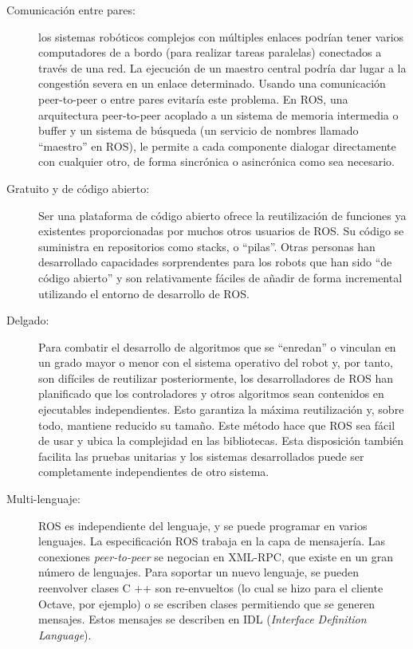 \begin{description}
	\item[Comunicación entre pares:] los sistemas robóticos complejos con múltiples enlaces podrían tener varios computadores de a bordo (para realizar tareas paralelas) conectados a través de una red. La ejecución de un maestro central podría dar lugar a la congestión severa en un enlace determinado. Usando una comunicación peer-to-peer o entre pares evitaría este problema. En ROS, una arquitectura peer-to-peer acoplado a un sistema de memoria intermedia o buffer y un sistema de búsqueda (un servicio de nombres llamado ``maestro'' en ROS), le permite a cada componente dialogar directamente con cualquier otro, de forma sincrónica o asincrónica como sea necesario.

	\item[Gratuito y de código abierto:] Ser una plataforma de código abierto ofrece la reutilización de funciones ya existentes proporcionadas por muchos otros usuarios de ROS. Su código se suministra en repositorios como stacks, o ``pilas''. Otras personas han desarrollado capacidades sorprendentes para los robots que han sido ``de código abierto'' y son relativamente fáciles de añadir de forma incremental utilizando el entorno de desarrollo de ROS.

	\item[Delgado:] Para combatir el desarrollo de algoritmos que se ``enredan'' o vinculan en un grado mayor o menor con el sistema operativo del robot y, por tanto, son difíciles de reutilizar posteriormente, los desarrolladores de ROS han planificado que los controladores y otros algoritmos sean contenidos en ejecutables independientes. Esto garantiza la máxima reutilización y, sobre todo, mantiene reducido su tamaño. Este método hace que ROS sea fácil de usar y ubica la complejidad en las bibliotecas. Esta disposición también facilita las pruebas unitarias y los sistemas desarrollados puede ser completamente independientes de otro sistema.

	\item[Multi-lenguaje:] ROS es independiente del lenguaje, y se puede programar en varios lenguajes. La especificación ROS trabaja en la capa de mensajería. Las conexiones \textit{peer-to-peer} se negocian en XML-RPC, que existe en un gran número de lenguajes. Para soportar un nuevo lenguaje, se pueden reenvolver clases C ++ son re-envueltos (lo cual se hizo para el cliente Octave, por ejemplo) o se escriben clases permitiendo que se generen mensajes. Estos mensajes se describen en IDL (\textit{Interface Definition Language}). \cite{quigley2009ros}
\end{description}

